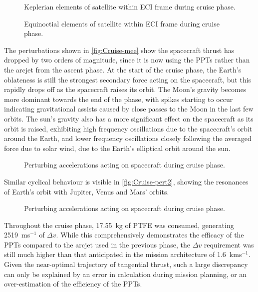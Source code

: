 \begin{figure}
\caption{Keplerian elements of satellite within ECI frame during cruise phase.} \label{fig:Cruise-kep}
\centering
\def\svgwidth{\figurewidth}

\end{figure}

\begin{figure}
\caption{Equinoctial elements of satellite within ECI frame during cruise phase.} \label{fig:Cruise-mee}
\centering
\def\svgwidth{\figurewidth}

\end{figure}

The perturbations shown in \autoref{fig:Cruise-mee} show the spacecraft thrust has dropped by two orders of magnitude, since it is now using the PPTs rather than the arcjet from the ascent phase. At the start of the cruise phase, the Earth's oblateness is still the strongest secondary force acting on the spacecraft, but this rapidly drops off as the spacecraft raises its orbit. The Moon's gravity becomes more dominant towards the end of the phase, with spikes starting to occur indicating gravitational assists caused by close passes to the Moon in the last few orbits. The sun's gravity also has a more significant effect on the spacecraft as its orbit is raised, exhibiting high frequency oscillations due to the spacecraft's orbit around the Earth, and lower frequency oscillations closely following the averaged force due to solar wind, due to the Earth's elliptical orbit around the sun.

\begin{figure}
\caption{Perturbing accelerations acting on spacecraft during cruise phase.} \label{fig:Cruise-pert}
\centering
\def\svgwidth{\figurewidth}

\end{figure}

Similar cyclical behaviour is visible in \autoref{fig:Cruise-pert2}, showing the resonances of Earth's orbit with Jupiter, Venus and Mars' orbits.

\begin{figure}
\caption{Perturbing accelerations acting on spacecraft during cruise phase.} \label{fig:Cruise-pert2}
\centering
\def\svgwidth{\figurewidth}

\end{figure}

Throughout the cruise phase, 17.55~kg of PTFE was consumed, generating 2519~ms$^{-1}$ of $\Delta v$. While this comprehensively demonstrates the efficacy of the PPTs compared to the arcjet used in the previous phase, the $\Delta v$ requirement was still much higher than that anticipated in the mission architecture of 1.6~kms$^{-1}$. Given the near-optimal trajectory of tangential thrust, such a large discrepancy can only be explained by an error in calculation during mission planning, or an over-estimation of the efficiency of the PPTs.


